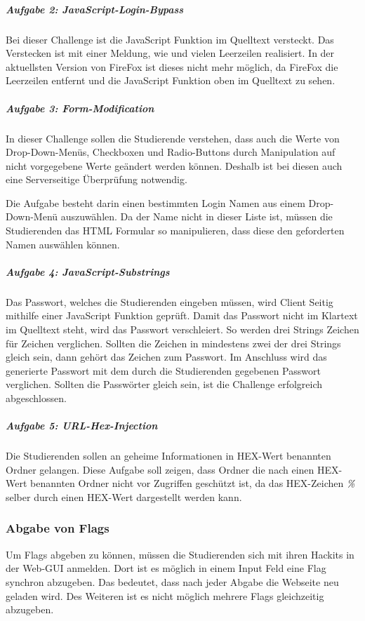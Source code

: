 \subparagraph{Aufgabe 2: JavaScript-Login-Bypass}\label{subpara:Aufgabe_2_JavaScript-Login-Bypass}
Bei dieser Challenge ist die JavaScript Funktion im Quelltext versteckt. Das Verstecken ist mit einer Meldung, wie  und vielen Leerzeilen realisiert. In der aktuellsten Version von FireFox ist dieses nicht mehr möglich, da FireFox die Leerzeilen entfernt und die JavaScript Funktion oben im Quelltext zu sehen.

\subparagraph{Aufgabe 3: Form-Modification}\label{subpara:Aufgabe_3_Form-Modification}
In dieser Challenge sollen die Studierende verstehen, dass auch die Werte von Drop-Down-Menüs, Checkboxen und Radio-Buttons durch Manipulation auf nicht vorgegebene Werte geändert werden können. Deshalb ist bei diesen auch eine Serverseitige Überprüfung notwendig.

Die Aufgabe besteht darin einen bestimmten Login Namen aus einem Drop-Down-Menü auszuwählen. Da der Name nicht in dieser Liste ist, müssen die Studierenden das HTML Formular so manipulieren, dass diese den geforderten Namen auswählen können.

\subparagraph{Aufgabe 4: JavaScript-Substrings}\label{subpara:Aufgabe_4_JavaScript-Substrings}
Das Passwort, welches die Studierenden eingeben müssen, wird Client Seitig mithilfe einer JavaScript Funktion geprüft. Damit das Passwort nicht im Klartext im Quelltext steht, wird das Passwort verschleiert. So werden drei Strings Zeichen für Zeichen verglichen. Sollten die Zeichen in mindestens zwei der drei Strings gleich sein, dann gehört das Zeichen zum Passwort. Im Anschluss wird das generierte Passwort mit dem durch die Studierenden gegebenen Passwort verglichen. Sollten die Passwörter gleich sein, ist die Challenge erfolgreich abgeschlossen.

\subparagraph{Aufgabe 5: URL-Hex-Injection}\label{subpara:Aufgabe_5_URL-Hex-Injection}
Die Studierenden sollen an geheime Informationen in HEX-Wert benannten Ordner gelangen. Diese Aufgabe soll zeigen, dass Ordner die nach einen HEX-Wert benannten Ordner nicht vor Zugriffen geschützt ist, da das HEX-Zeichen \textit{\%} selber durch einen HEX-Wert dargestellt werden kann.

\subsubsection{Abgabe von Flags}\label{subsubsec:Abgabe_von_Flags}
Um Flags abgeben zu können, müssen die Studierenden sich mit ihren Hackits in der Web-GUI anmelden. Dort ist es möglich in einem Input Feld eine Flag synchron abzugeben. Das bedeutet, dass nach jeder Abgabe die Webseite neu geladen wird. Des Weiteren ist es nicht möglich mehrere Flags gleichzeitig abzugeben.

